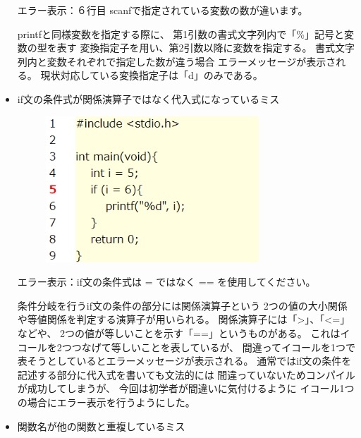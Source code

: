 \documentclass{csspaper}
\begin{document}
\begin{itemize}
         エラー表示：６行目 scanfで指定されている変数の数が違います。

         printfと同様変数を指定する際に、
         第1引数の書式文字列内で「\%」記号と変数の型を表す
         変換指定子を用い、第2引数以降に変数を指定する。
         書式文字列内と変数それぞれで指定した数が違う場合
         エラーメッセージが表示される。
         現状対応している変換指定子は「d」のみである。

         \item if文の条件式が関係演算子ではなく代入式になっているミス
         
         \begin{figure}[h]
            \centering
            \includegraphics[width=8cm]{sample3.png}
         \end{figure}

         エラー表示：if文の条件式は = ではなく == を使用してください。

         条件分岐を行うif文の条件の部分には関係演算子という
         2つの値の大小関係や等値関係を判定する演算子が用いられる。
         関係演算子には「\textgreater」、「\textless=」などや、
         2つの値が等しいことを示す「==」というものがある。
         これはイコールを2つつなげて等しいことを表しているが、
         間違ってイコールを1つで表そうとしているとエラーメッセージが表示される。
         通常ではif文の条件を記述する部分に代入式を書いても文法的には
         間違っていないためコンパイルが成功してしまうが、
         今回は初学者が間違いに気付けるように
         イコール1つの場合にエラー表示を行うようにした。

         \item 関数名が他の関数と重複しているミス
         

\end{itemize}
\end{document}
